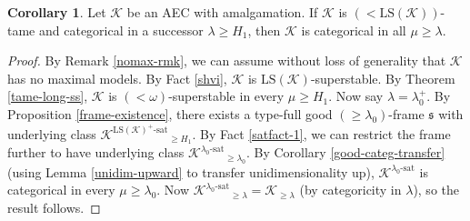 \documentclass[12pt]{amsart}
\theoremstyle{definition}
\newtheorem{cor}[mydef]{Corollary}
\begin{document}
\begin{cor}\label{gv-alternate}
  Let ${\mathcal{K}}$ be an AEC with amalgamation. If ${\mathcal{K}}$ is $(<{\text{LS}} ({\mathcal{K}}))$-tame and categorical in a successor $\lambda \ge H_1$, then ${\mathcal{K}}$ is categorical in all $\mu \ge \lambda$.
\end{cor}
\begin{proof}
  By Remark \ref{nomax-rmk}, we can assume without loss of generality that ${\mathcal{K}}$ has no maximal models. By Fact \ref{shvi}, ${\mathcal{K}}$ is ${\text{LS}} ({\mathcal{K}})$-superstable. By Theorem \ref{tame-long-ss}, ${\mathcal{K}}$ is $(<\omega)$-superstable in every $\mu \ge H_1$. Now say $\lambda = \lambda_0^+$. By Proposition \ref{frame-existence}, there exists a type-full good $(\ge \lambda_0)$-frame ${\mathfrak{s}}$ with underlying class ${{{{\mathcal{K}}}^{{{{\text{LS}} ({\mathcal{K}})^+}}\text{-sat}}}}_{\ge H_1}$. By Fact \ref{satfact-1}, we can restrict the frame further to have underlying class ${{{{\mathcal{K}}}^{{{\lambda_0}}\text{-sat}}}}_{\ge \lambda_0}$. By Corollary \ref{good-categ-transfer} (using Lemma \ref{unidim-upward} to transfer unidimensionality up), ${{{{\mathcal{K}}}^{{{\lambda_0}}\text{-sat}}}}$ is categorical in every $\mu \ge \lambda_0$. Now ${{{{\mathcal{K}}}^{{{\lambda_0}}\text{-sat}}}}_{\ge \lambda} = {\mathcal{K}}_{\ge \lambda}$ (by categoricity in $\lambda$), so the result follows.
\end{proof}



\end{document}
